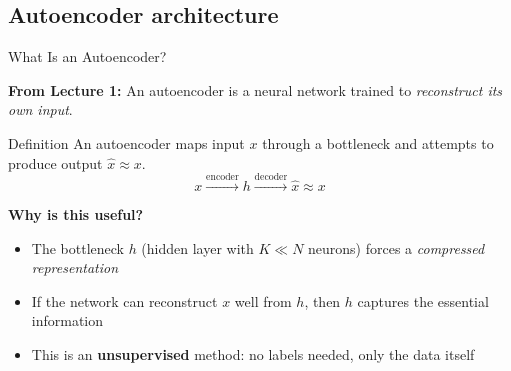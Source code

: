 \documentclass[aspectratio=169]{beamer}
\begin{document}
\subsection{Autoencoder architecture}
%
\begin{frame}{What Is an Autoencoder?}

\textbf{From Lecture 1:} An autoencoder is a neural network trained to \emph{reconstruct its own input}.

\vspace{0.5em}
\begin{block}{Definition}
An autoencoder maps input $x$ through a bottleneck and attempts to produce output $\hat{x} \approx x$.
\[
x \xrightarrow{\text{encoder}} h \xrightarrow{\text{decoder}} \hat{x} \approx x
\]
\end{block}

\vspace{0.3em}
\textbf{Why is this useful?}
\begin{itemize}
    \item The bottleneck $h$ (hidden layer with $K \ll N$ neurons) forces a \emph{compressed representation}
    \item If the network can reconstruct $x$ well from $h$, then $h$ captures the essential information
    \item This is an \textbf{unsupervised} method: no labels needed, only the data itself
\end{itemize}

\end{frame}
%
%
\end{document}
